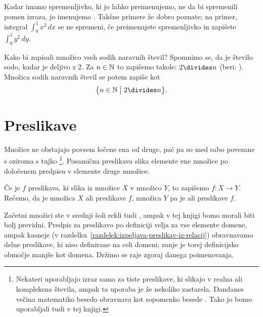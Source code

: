                 Kadar imamo spremenljivko, ki jo lahko preimenujemo, ne da bi spremenili pomen izraza, jo imenujemo . Takšne primere že dobro poznate; na primer, integral $\int_0^1 x^2 \,dx$ se ne spremeni, če preimenujete spremenljivko in zapišete $\int_0^1 y^2 \,dy$.

                \begin{zgled}
                        Kako bi zapisali množico vseh sodih naravnih števil? Spomnimo se, da je število sodo, kadar je deljivo z $2$. Za $n \in \mathbb{N}$ to zapišemo takole: $2 \divides n$ (beri: ). Množica sodih naravnih števil se potem zapiše kot
                        \[\set[1]{n \in \NN}{2 \divides n}.\]
                \end{zgled}


        \section{Preslikave}

                Množice ne obstajajo povsem ločene ena od druge, pač pa so med sabo povezane s  oziroma s tujko \footnote{Nekateri uporabljajo izraz  samo za tiste preslikave, ki slikajo v realna ali kompleksna števila, ampak ta uporaba je že nekoliko zastarela. Dandanes večina matematiko besedo  obravnava kot sopomenko besede . Tako jo bomo uporabljali tudi v tej knjigi.}. Posamična preslikava slika elemente ene množice po določenem predpisu v elemente druge množice.

                Če je $f$ preslikava, ki slika iz množice $X$ v množico $Y$, to zapišemo $f\colon X \to Y$. Rečemo, da je množica $X$  ali  preslikave $f$, množica $Y$ pa je  ali  preslikave $f$.

                Začetni množici ste v srednji šoli rekli tudi , ampak v tej knjigi bomo morali biti bolj previdni. Predpis za preslikavo po definiciji velja za vse elemente domene, ampak kasneje (v razdelku~\ref{razdelek:izpeljava-preslikav-iz-relacij}) obravnavamo delne preslikave, ki niso definirane na celi domeni; zanje je torej definicijsko območje manjše kot domena. Držimo se raje zgoraj danega poimenovanja.

